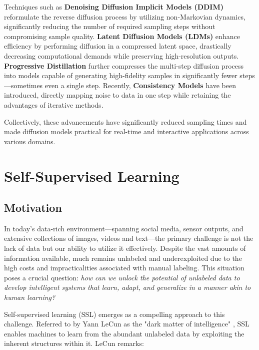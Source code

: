 Techniques such as \textbf{Denoising Diffusion Implicit Models (DDIM)} \cite{song2020denoising} reformulate the reverse diffusion process by utilizing non-Markovian dynamics, significantly reducing the number of required sampling steps without compromising sample quality. \textbf{Latent Diffusion Models (LDMs)} \cite{rombach2022high} enhance efficiency by performing diffusion in a compressed latent space, drastically decreasing computational demands while preserving high-resolution outputs. \textbf{Progressive Distillation} \cite{salimans2022progressive} further compresses the multi-step diffusion process into models capable of generating high-fidelity samples in significantly fewer steps—sometimes even a single step. Recently, \textbf{Consistency Models} \cite{song2023consistency} have been introduced, directly mapping noise to data in one step while retaining the advantages of iterative methods.

Collectively, these advancements have significantly reduced sampling times and made diffusion models practical for real-time and interactive applications across various domains.

\section{Self-Supervised Learning}\label{intro:ssl}

\subsection{Motivation}


In today's data-rich environment—spanning social media, sensor outputs, and extensive collections of images, videos and text—the primary challenge is not the lack of data but our ability to utilize it effectively. Despite the vast amounts of information available, much remains unlabeled and underexploited due to the high costs and impracticalities associated with manual labeling. This situation poses a crucial question: \textit{how can we unlock the potential of unlabeled data to develop intelligent systems that learn, adapt, and generalize in a manner akin to human learning?}

Self-supervised learning (SSL) emerges as a compelling approach to this challenge. Referred to by Yann LeCun as the "dark matter of intelligence" \citep{lecun2021self}, SSL enables machines to learn from the abundant unlabeled data by exploiting the inherent structures within it. LeCun remarks:

